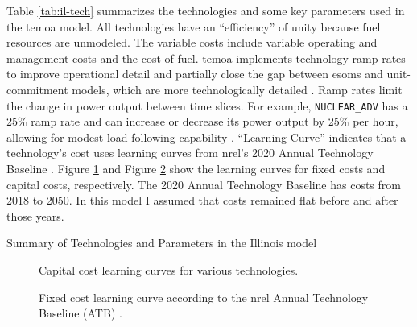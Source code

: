 Table \ref{tab:il-tech} summarizes the technologies and some key parameters
used in the \gls{temoa} model. All technologies have an ``efficiency'' of unity
because fuel resources are unmodeled. The variable costs
include variable operating and management costs and the cost of fuel. \gls{temoa}
implements technology ramp rates to improve operational detail and partially
close the gap between \glspl{esom} and unit-commitment models, which are more
technologically detailed \cite{de_queiroz_repurposing_2019}.
Ramp rates limit the change in power output between time slices. For example,
\texttt{NUCLEAR\_ADV} has a 25\% ramp rate and can increase or decrease
its power output by 25\% per hour, allowing for modest load-following capability
\cite{iaea_non-baseload_2017,lokhov_technical_2011}. ``Learning Curve'' indicates that a
technology's cost uses learning curves from \gls{nrel}'s 2020 Annual Technology
Baseline \cite{nrel_2020_2020}. Figure \ref{fig:capital_cost} and Figure
\ref{fig:fix_costs} show the learning curves for fixed costs and capital costs,
respectively. The 2020 Annual Technology Baseline has costs from 2018 to 2050. In this model
I assumed that costs remained flat before and after those years.

\begin{sidewaystable}
  \centering
  \caption{Summary of Technologies and Parameters in the Illinois model}
  \label{tab:il-tech}
  \resizebox{\textwidth}{!}{
  
  } %
\end{sidewaystable}


\begin{figure}[H]
  \centering
  \resizebox{0.6\textwidth}{!}{}
  \caption{Capital cost learning curves for various technologies.}
  \label{fig:capital_cost}
\end{figure}

\begin{figure}[H]
    \centering
    \resizebox{0.61\columnwidth}{!}{}
    \caption{Fixed cost learning curve according to the \gls{nrel} Annual
    Technology Baseline (ATB) \cite{nrel_2020_2020}.}
    \label{fig:fix_costs}
\end{figure}


